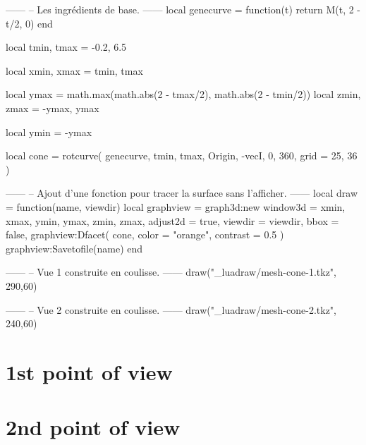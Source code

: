 \documentclass[varwidth, border = 3pt]{standalone}
\begin{document}
\begin{luadraw*}{}
------
-- Les ingrédients de base.
------
local genecurve = function(t)
  return M(t, 2 - t/2, 0)
end

local tmin, tmax = -0.2, 6.5

local xmin, xmax = tmin, tmax

local ymax = math.max(math.abs(2 - tmax/2), math.abs(2 - tmin/2))
local zmin, zmax = -ymax, ymax

local ymin = -ymax

local cone = rotcurve(
  genecurve, tmin, tmax,
  {Origin, -vecI},
  0, 360,
  {
    grid = {25, 36}
  }
)

------
-- Ajout d'une fonction pour tracer la surface sans l'afficher.
------
local draw = function(name, viewdir)
    local graphview = graph3d:new{
      window3d = {xmin, xmax, ymin, ymax, zmin, zmax},
      adjust2d = true,
      viewdir  = viewdir,
      bbox     = false,
    }
    graphview:Dfacet(
        cone,
        {
          color  = "orange",
          contrast = 0.5
        }
    )
    graphview:Savetofile(name)
end

------
-- Vue 1 construite en coulisse.
------
draw("_luadraw/mesh-cone-1.tkz", {290,60})

------
-- Vue 2 construite en coulisse.
------
draw("_luadraw/mesh-cone-2.tkz", {240,60})
\end{luadraw*}


\section*{1st point of view}




\section*{2nd point of view}


\end{document}

